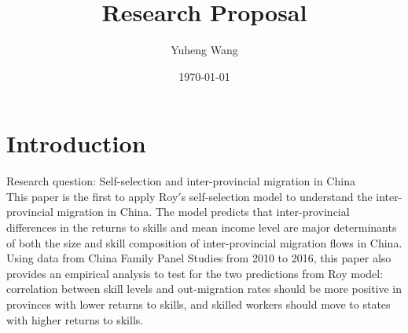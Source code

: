 \documentclass{article}
\title{Research Proposal}
\author{Yuheng Wang}
\date{\today}
\begin{document}
\maketitle
\section{Introduction}\label{first_section}

\setlength{\parindent}{0pt}

Research question: Self-selection and inter-provincial migration in China\\

This paper is the first to apply Roy$'$s self-selection model to understand the inter-provincial migration in China. The model predicts that inter-provincial differences in the returns to skills and mean income level are major determinants of both the size and skill composition of inter-provincial migration flows in China. Using data from China Family Panel Studies from 2010 to 2016, this paper also provides an empirical analysis to test for the two predictions from Roy model: correlation between skill levels and out-migration rates should be more positive in provinces with lower returns to skills, and skilled workers should move to states with higher returns to skills.
\end{document}
